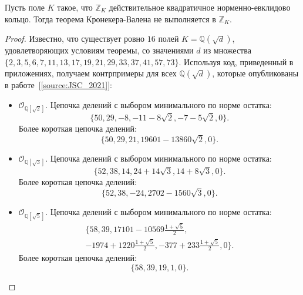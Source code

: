 \documentclass[_00_dissertation.tex]{subfiles}
\begin{document}
\begin{theorem}\label{theorem:kronecker}
    Пусть поле $K$ такое, что $\mathbb{Z}_K$ действительное квадратичное норменно-евклидово кольцо.
    Тогда теорема Кронекера-Валена не выполняется в $\mathbb{Z}_K$.
\end{theorem}
\begin{proof}
    Известно, что существует ровно $16$ полей $K = \mathbb{Q}(\sqrt{d})$, удовлетворяющих условиям теоремы, со значениями $d$ из множества $\{2, 3, 5, 6, 7, 11, 13, 17, 19, 21, 29, 33, 37, 41, 57, 73\}$.
    Используя код, приведенный в приложениях, получаем контрпримеры для всех $\mathbb{Q}(\sqrt{d})$, которые опубликованы в работе~[\ref{source:JSC_2021}]:
    \begin{itemize}
        \item $\mathcal{O}_{\mathbb{Q}[\sqrt{2}]}$.
        Цепочка делений с выбором минимального по норме остатка:
        \begin{equation*}
            \{50, 29, -8, -11-8\sqrt{2}, -7-5\sqrt{2}, 0\}.
        \end{equation*}
        Более короткая цепочка делений:
        \begin{equation*}
            \{50, 29, 21, 19601-13860\sqrt{2}, 0\}.
        \end{equation*}
    
        \item $\mathcal{O}_{\mathbb{Q}[\sqrt{3}]}$.
        Цепочка делений с выбором минимального по норме остатка:
        \begin{equation*}
            \{52, 38, 14, 24+14\sqrt{3}, 14+8\sqrt{3}, 0\}.
        \end{equation*}
        Более короткая цепочка делений:
        \begin{equation*}
            \{52, 38, -24, 2702-1560\sqrt{3}, 0\}.
        \end{equation*}
    
        \item $\mathcal{O}_{\mathbb{Q}[\sqrt{5}]}$.
        Цепочка делений с выбором минимального по норме остатка:
        \begin{multline*}
            \{58, 39, 17101-10569\frac{1+\sqrt{5}}{2},\\
            -1974+1220\frac{1+\sqrt{5}}{2}, -377+233\frac{1+\sqrt{5}}{2}, 0\}.
        \end{multline*}
        Более короткая цепочка делений:
        \begin{equation*}
            \{58, 39, 19, 1, 0\}.
        \end{equation*}
    

\end{itemize}
\end{proof}
\end{document}
